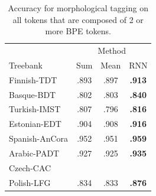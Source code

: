 \documentclass[11pt]{article}
\begin{document}
	\begin{table}[h]
	\centering
	\begin{tabular}{l|ccc}
		 & \multicolumn{3}{c}{Method} \\
		Treebank & Sum & Mean & RNN \\
		 		\hline
		Finnish-TDT & .893 & .897 & \textbf{.913} \\ 
		Basque-BDT  & .802 & .803 & \textbf{.840} \\
		Turkish-IMST & .807 & .796 & \textbf{.816} \\
		Estonian-EDT & .904 & .908 & \textbf{.916} \\
		Spanish-AnCora & .952 & .951 & \textbf{.959} \\
		Arabic-PADT & .927 & .925 & \textbf{.935}\\
		Czech-CAC & & & \\
		Polish-LFG & .834 & .833 & \textbf{.876} \\
	\end{tabular}
	\caption{\label{tab:results_large_tokens} Accuracy for morphological tagging on all tokens that are composed of 2 or more BPE tokens.}
\end{table}
\end{document}
